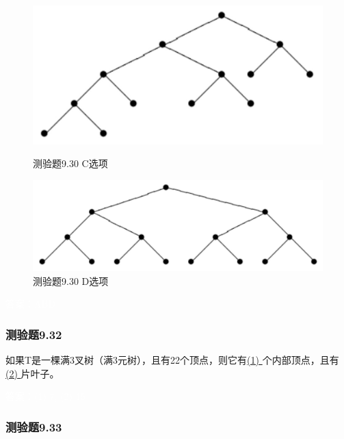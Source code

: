 \documentclass[UTF8, heading=true]{ctexart}
\begin{document}
\begin{figure}[H]
  \centering
  \begin{minipage}[t]{0.29\textwidth}
      \centering
      \includegraphics[width=1\textwidth]{9.30_3.jpg} %
      \vspace{-0.3cm}
      \caption{测验题9.30 C选项}
  \end{minipage}
  \hspace{0.2\textwidth} %
  \begin{minipage}[t]{0.34\textwidth}
      \centering
      \includegraphics[width=1\textwidth]{9.30_4.jpg} %
      \vspace{-0.3cm}
      \caption{测验题9.30 D选项}
\end{minipage}
\end{figure}

\textcolor{white}{答案：ABD}

\subsubsection{测验题9.32}

如果T是一棵满3叉树（满3元树），且有22个顶点，则它有\underline{\quad (1) \quad}个内部顶点，且有
\underline{\quad (2) \quad}片叶子。

\textcolor{white}{答案：(1) 7, (2) 15}

\subsubsection{测验题9.33}
\end{document}
